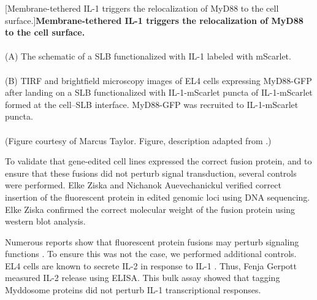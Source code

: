 \begin{centering}
\captionsetup{parbox=none}
[Membrane-tethered IL-1{\textbeta} triggers the relocalization of MyD88 to the cell surface.]{\textbf{Membrane-tethered IL-1{\textbeta} triggers the relocalization of MyD88 to the cell surface.}
\\
\\
(A) The schematic of a SLB functionalized with IL-1{\textbeta} labeled with mScarlet.
\\
\\
(B) TIRF and brightfield microscopy images of EL4 cells expressing MyD88-GFP after landing on a SLB functionalized with IL-1{\textbeta}-mScarlet puncta of IL-1{\textbeta}-mScarlet formed at the cell--SLB interface. MyD88-GFP was recruited to IL-1{\textbeta}-mScarlet puncta.
\\
\\
(Figure courtesy of Marcus Taylor. Figure, description adapted from \autocite{Deliz-Aguirre_2021}.)}
\label{p1:1}
\end{centering}

To validate that gene-edited cell lines expressed the correct fusion protein, and to ensure that these fusions did not perturb signal transduction, several controls were performed. Elke Ziska and Nichanok Auevechanickul verified correct insertion of the fluorescent protein in edited genomic loci using DNA sequencing. Elke Ziska confirmed the correct molecular weight of the fusion protein using western blot analysis.

Numerous reports show that fluorescent protein fusions may perturb signaling functions \autocite{Miyawaki_2003}\autocite{Haugh_2012}. To ensure this was not the case, we performed additional controls. EL4 cells are known to secrete IL-2 in response to IL-1 \autocite{Hoegen_1989}. Thus, Fenja Gerpott measured IL-2 release using ELISA. This bulk assay showed that tagging Myddosome proteins did not perturb IL-1 transcriptional responses.

